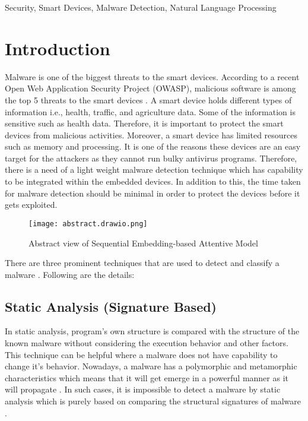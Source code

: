 \documentclass[conference]{IEEEtran}
\begin{document}
\begin{IEEEkeywords}
Security, Smart Devices, Malware Detection, Natural Language Processing 
\end{IEEEkeywords}

\section{Introduction}
Malware is one of the biggest threats to the smart devices. According to a recent Open Web Application Security Project (OWASP), malicious software is among the top 5 threats to the smart devices \cite{b29}. A smart device holds different types of information i.e., health, traffic, and agriculture data. Some of the information is sensitive such as health data. Therefore, it is important to protect the smart devices from malicious activities. Moreover, a smart device has limited resources such as memory and processing. It is one of the reasons these devices are an easy target for the attackers \cite{b30} as they cannot run bulky antivirus programs. Therefore, there is a need of a light weight malware detection technique which has capability to be integrated within the embedded devices. In addition to this, the time taken for malware detection should be minimal in order to protect the devices before it gets exploited. 
\begin{figure}[htbp]
\centerline{\texttt{[image: abstract.drawio.png]}}
\caption{Abstract view of Sequential Embedding-based Attentive Model}
\label{fig21}
\end{figure}
There are three prominent techniques that are used to detect and classify a malware \cite{b18}. Following are the details:
\subsection{Static Analysis (Signature Based)}
In static analysis, program's own structure is compared with the structure of the known malware without considering the execution behavior and other factors. This technique can be helpful where a malware does not have capability to change it's behavior. Nowadays, a malware has a polymorphic and metamorphic characteristics which means that it will get emerge in a powerful manner as it will propagate \cite{b31}. In such cases, it is impossible to detect a malware by static analysis which is purely based on comparing the structural signatures of malware \cite{b25}.
\end{document}
